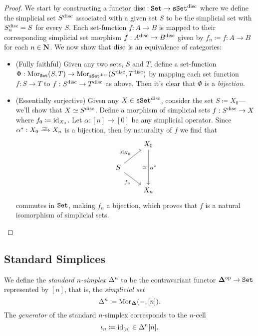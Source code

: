 \begin{proof}
We start by constructing a functor \(\text{disc}: {\texttt{Set}} \to {\texttt{sSet}}^{\text{disc}}\) where we
define the simplicial set \(S^{\text{disc}}\) associated with a given set \(S\) to be
the simplicial set with \(S_n^{\text{disc}} = S\) for every \(S\). Each set-function
\(f: A \to B\) is mapped to their corresponding simplicial set morphism
\(f: A^{\text{disc}} \to B^{\text{disc}}\) given by \(f_n \coloneq f: A \to B\) for each
\(n \in \mathbf{N}\). We now show that \(\text{disc}\) is an equivalence of categories:

\begin{itemize}\setlength\itemsep{0em}
\item (Fully faithful) Given any two sets, \(S\) and \(T\), define a
  set-function
  \(\Phi: \operatorname{Mor}_{{\texttt{Set}}}(S, T) \to \operatorname{Mor}_{{\texttt{sSet}}^{\text{disc}}}(S^{\text{disc}}, T^{\text{disc}})\) by
  mapping each set function \(f: S \to T\) to \(f: S^{\text{disc}} \to T^{\text{disc}}\) as
  above. Then it's clear that \(\Phi\) is a \emph{bijection}.

\item (Essentially surjective) Given any \(X \in {\texttt{sSet}}^{\text{disc}}\), consider the
  set \(S \coloneq X_0\)---we'll show that \(X \simeq S^{\text{disc}}\). Define a
  morphism of simplicial sets \(f: S^{\text{disc}} \to X\) where \(f_0 \coloneq
  \operatorname{id}_{X_0}\). Let \(\alpha: [n] \to [0]\) be any simplicial operator. Since
  \(\alpha^{*}: X_0 \isoto X_n\) is a bijection, then by naturality of \(f\) we
  find that
  \[
  \begin{tikzcd}
  &X_0 \ar[dd, "\dis"', "\alpha^{*}"]
  \\
  S \ar[ru, "\Id_{X_0}"] \ar[rd, "f_n"'] &
  \\
  &X_n
  \end{tikzcd}
  \]
  commutes in \({\texttt{Set}}\), making \(f_n\) a bijection, which proves that \(f\) is a
  natural isomorphism of simplicial sets.
\end{itemize}
\end{proof}

\subsection{Standard Simplices}

\begin{definition}
\label{def:standard-n-simplex}
We define the \emph{standard \(n\)-simplex} \(\Delta^n\) to be the contravariant
functor \({\mathbf{\Delta}}^{\mathrm{op}} \to {\texttt{Set}}\) represented by \([n]\), that is, the
\emph{simplicial set}
\[
\Delta^n \coloneq \operatorname{Mor}_{{\mathbf{\Delta}}}(-, [n]).
\]
The \emph{generator} of the standard \(n\)-simplex corresponds to the \(n\)-cell
\[
\iota_n \coloneq \operatorname{id}_{[n]} \in \Delta^n [n].
\]
\end{definition}

